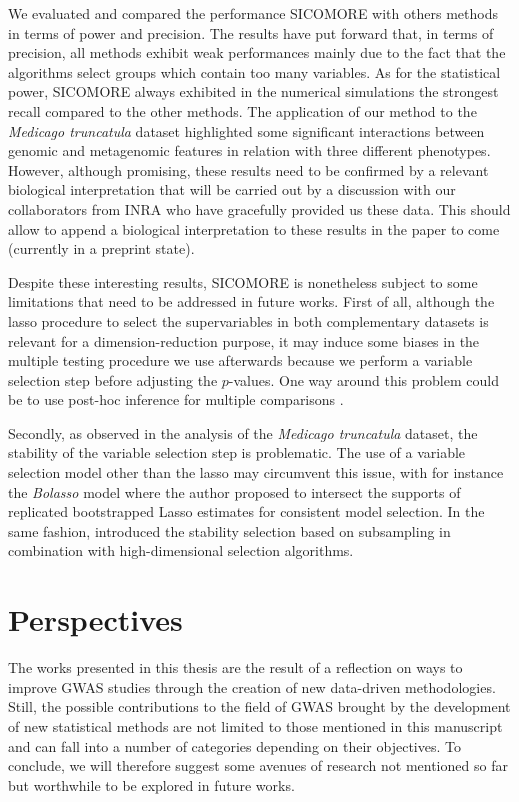 \documentclass[]{book}
\begin{document}
We evaluated and compared the performance SICOMORE with others methods
in terms of power and precision. The results have put forward that, in
terms of precision, all methods exhibit weak performances mainly due to
the fact that the algorithms select groups which contain too many
variables. As for the statistical power, SICOMORE always exhibited in
the numerical simulations the strongest recall compared to the other
methods. The application of our method to the \emph{Medicago truncatula}
dataset highlighted some significant interactions between genomic and
metagenomic features in relation with three different phenotypes.
However, although promising, these results need to be confirmed by a
relevant biological interpretation that will be carried out by a
discussion with our collaborators from INRA who have gracefully provided
us these data. This should allow to append a biological interpretation
to these results in the paper to come (currently in a preprint state).

Despite these interesting results, SICOMORE is nonetheless subject to
some limitations that need to be addressed in future works. First of
all, although the lasso procedure to select the supervariables in both
complementary datasets is relevant for a dimension-reduction purpose, it
may induce some biases in the multiple testing procedure we use
afterwards because we perform a variable selection step before adjusting
the \(p\)-values. One way around this problem could be to use post-hoc
inference for multiple comparisons \citep{goeman2011multiple}.

Secondly, as observed in the analysis of the \emph{Medicago truncatula}
dataset, the stability of the variable selection step is problematic.
The use of a variable selection model other than the lasso may
circumvent this issue, with for instance the \emph{Bolasso} model
\citep{bach2008bolasso} where the author proposed to intersect the supports
of replicated bootstrapped Lasso estimates for consistent model
selection. In the same fashion, \citep{meinshausen2010stability} introduced
the stability selection based on subsampling in combination with
high-dimensional selection algorithms.

\hypertarget{perspectives}{%
\section*{Perspectives}\label{perspectives}}

The works presented in this thesis are the result of a reflection on
ways to improve GWAS studies through the creation of new data-driven
methodologies. Still, the possible contributions to the field of GWAS
brought by the development of new statistical methods are not limited to
those mentioned in this manuscript and can fall into a number of
categories depending on their objectives. To conclude, we will therefore
suggest some avenues of research not mentioned so far but worthwhile to
be explored in future works.
\end{document}
